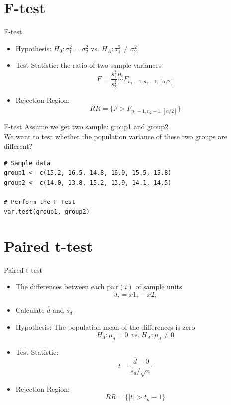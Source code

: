 \documentclass[aspectratio=169]{beamer}
\begin{document}
\section{F-test}
\begin{frame}{F-test}
\begin{itemize}
    \item Hypothesis: $H_0: \sigma_1^2 = \sigma_2^2$ vs. $H_A: \sigma_1^2 \neq \sigma_2^2$
    \item Test Statistic: the ratio of two sample variances
    \[
    F = \frac{s_1^2}{s_2^2} \overset{H_0}{\sim} F_{n_1-1, n_2-1,[\alpha/2]}
    \]
    \item Rejection Region:
    \[
    RR = \{F > F_{n_1-1, n_2-1,[\alpha/2]}\} 
    \]
\end{itemize}
\end{frame}



\begin{frame}[fragile]{F-test}
Assume we get two sample: group1 and group2\\
We want to test whether the population variance of these two groups are different?\\
\begin{lstlisting}
# Sample data
group1 <- c(15.2, 16.5, 14.8, 16.9, 15.5, 15.8)
group2 <- c(14.0, 13.8, 15.2, 13.9, 14.1, 14.5)

# Perform the F-Test
var.test(group1, group2)
\end{lstlisting}
\end{frame}

\section{Paired t-test}
\begin{frame}{Paired t-test}
\begin{itemize}
    \item The differences between each pair$(i)$ of sample units
    \[
    d_i = x1_i - x2_i
    \]
    \item Calculate $\overline{d}$ and $s_d$
    \item Hypothesis: The population mean of the differences is zero
    \[
    H_0: \mu_d = 0\ \ vs.\ H_A: \mu_d \neq 0
    \]
    \item Test Statistic:
    \[
    t = \frac{\overline{d}-0}{s_d/\sqrt{n}}
    \]
    \item Rejection Region:
    \[
    RR = \{|t| > t_n-1\} 
    \]
\end{itemize}
\end{frame}
\end{document}
